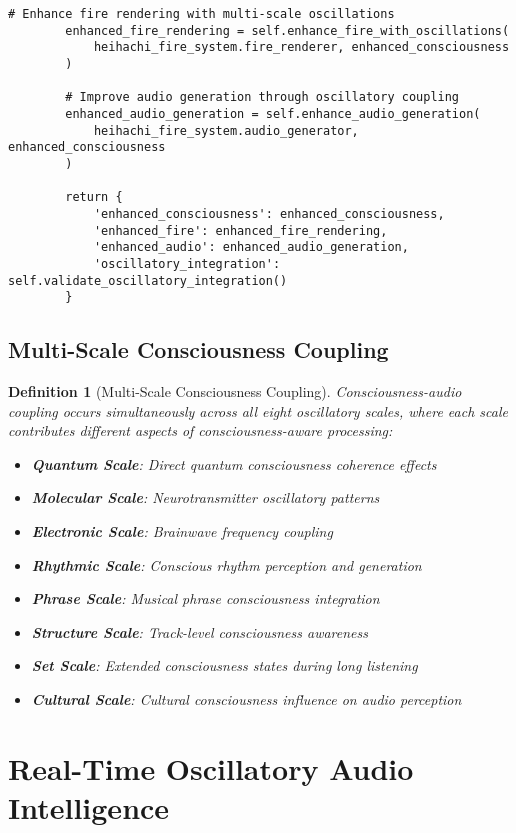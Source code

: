 \documentclass[12pt,a4paper]{article}
\newtheorem{definition}{Definition}
\begin{document}
\begin{lstlisting}[style=pythonstyle, caption=Oscillatory Fire Interface Enhancement]
        # Enhance fire rendering with multi-scale oscillations
        enhanced_fire_rendering = self.enhance_fire_with_oscillations(
            heihachi_fire_system.fire_renderer, enhanced_consciousness
        )
        
        # Improve audio generation through oscillatory coupling
        enhanced_audio_generation = self.enhance_audio_generation(
            heihachi_fire_system.audio_generator, enhanced_consciousness
        )
        
        return {
            'enhanced_consciousness': enhanced_consciousness,
            'enhanced_fire': enhanced_fire_rendering,
            'enhanced_audio': enhanced_audio_generation,
            'oscillatory_integration': self.validate_oscillatory_integration()
        }
\end{lstlisting}

\subsection{Multi-Scale Consciousness Coupling}

\begin{definition}[Multi-Scale Consciousness Coupling]
Consciousness-audio coupling occurs simultaneously across all eight oscillatory scales, where each scale contributes different aspects of consciousness-aware processing:

\begin{itemize}
\item \textbf{Quantum Scale}: Direct quantum consciousness coherence effects
\item \textbf{Molecular Scale}: Neurotransmitter oscillatory patterns
\item \textbf{Electronic Scale}: Brainwave frequency coupling
\item \textbf{Rhythmic Scale}: Conscious rhythm perception and generation
\item \textbf{Phrase Scale}: Musical phrase consciousness integration
\item \textbf{Structure Scale}: Track-level consciousness awareness
\item \textbf{Set Scale}: Extended consciousness states during long listening
\item \textbf{Cultural Scale}: Cultural consciousness influence on audio perception
\end{itemize}
\end{definition}

\section{Real-Time Oscillatory Audio Intelligence}
\end{document}
